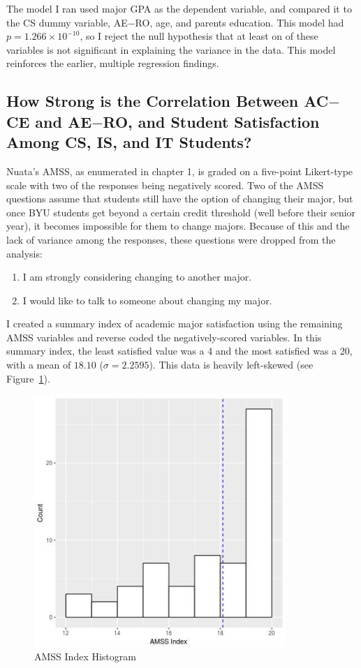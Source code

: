 The model I ran used major GPA as the dependent variable, and compared it to the CS dummy variable, AE$-$RO, age, and parents education. This model had $p=1.266\times 10^{-10}$, so I reject the null hypothesis that at least on of these variables is not significant in explaining the variance in the data. This model reinforces the earlier, multiple regression findings.

\subsection{How Strong is the Correlation Between AC$-$CE and AE$-$RO, and Student Satisfaction Among CS, IS, and IT Students?}
Nuata's AMSS, as enumerated in chapter 1, is graded on a five-point Likert-type scale with two of the responses being negatively scored. Two of the AMSS questions assume that students still have the option of changing their major, but once BYU students get beyond a certain credit threshold (well before their senior year), it becomes impossible for them to change majors. Because of this and the lack of variance among the responses, these questions were dropped from the analysis:
\begin{enumerate}
  \item I am strongly considering changing to another major.
  \item I would like to talk to someone about changing my major.
\end{enumerate}

I created a summary index of academic major satisfaction using the remaining AMSS variables and reverse coded the negatively-scored variables. In this summary index, the least satisfied value was a 4 and the most satisfied was a 20, with a mean of $18.10$ ($\sigma=2.2595$). This data is heavily left-skewed (see Figure~\ref{fig:c-amss_index_plot}).

\begin{figure}[!hbtp]
  \centering
  \includegraphics[width=0.85\textwidth]{figures/chapter4/amss_index_plot.jpg}
  \caption{AMSS Index Histogram}
  \label{fig:c-amss_index_plot}
\end{figure}

